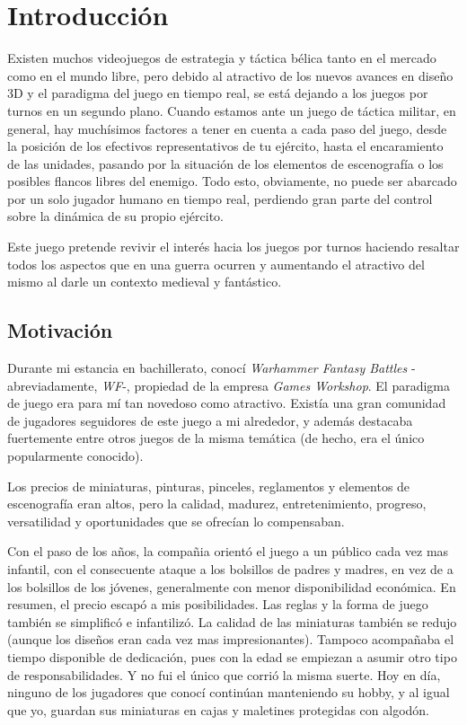 

\chapter{Introducción}
\label{chap:introduccion}

Existen muchos videojuegos de estrategia y táctica bélica tanto en el
mercado como en el mundo libre, pero debido al atractivo de los nuevos
avances en diseño 3D y el paradigma del juego en tiempo real, se está
dejando a los juegos por turnos en un segundo plano. Cuando estamos
ante un juego de táctica militar, en general, hay muchísimos factores
a tener en cuenta a cada paso del juego, desde la posición de los
efectivos representativos de tu ejército, hasta el encaramiento de las
unidades, pasando por la situación de los elementos de escenografía o
los posibles flancos libres del enemigo. Todo esto, obviamente, no
puede ser abarcado por un solo jugador humano en tiempo real,
perdiendo gran parte del control sobre la dinámica de su propio
ejército.

Este juego pretende revivir el interés hacia los juegos por turnos
haciendo resaltar todos los aspectos que en una guerra ocurren y
aumentando el atractivo del mismo al darle un contexto medieval y
fantástico. 

\section{Motivación}
Durante mi estancia en bachillerato, conocí \textit{Warhammer Fantasy
  Battles} -abreviadamente, \textit{WF}-, propiedad de la empresa
\emph{Games Workshop}. El paradigma de juego era para
mí tan novedoso como atractivo. Existía una gran comunidad de
jugadores seguidores de este juego a mi alrededor, y además destacaba
fuertemente entre otros juegos de la misma temática (de hecho, era el
único popularmente conocido).

Los precios de miniaturas, pinturas, pinceles, reglamentos y elementos
de escenografía eran altos, pero la calidad, madurez, entretenimiento,
progreso, versatilidad y oportunidades que se ofrecían lo
compensaban.

Con el paso de los años, la compañia orientó el juego a un público
cada vez mas infantil, con el consecuente ataque a los bolsillos de
padres y madres, en vez de a los bolsillos de los jóvenes,
generalmente con menor disponibilidad económica. En resumen, el precio
escapó a mis posibilidades. Las reglas y la forma de juego también se
simplificó e infantilizó. La calidad de las miniaturas también se
redujo (aunque los diseños eran cada vez mas impresionantes). Tampoco
acompañaba el tiempo disponible de dedicación, pues con la edad se
empiezan a asumir otro tipo de responsabilidades. Y no fui el único
que corrió la misma suerte. Hoy en día, ninguno de los jugadores que
conocí continúan manteniendo su hobby, y al igual que yo, guardan sus
miniaturas en cajas y maletines protegidas con algodón.

